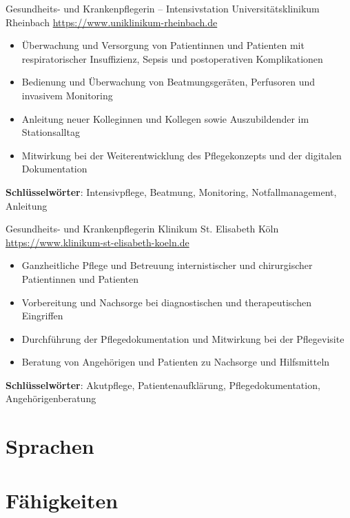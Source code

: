 \documentclass[a4paper, serif, 10pt]{moderncv}
\begin{document}
        {Gesundheits- und Krankenpflegerin – Intensivstation}
        {Universitätsklinikum Rheinbach}
        {\url{https://www.uniklinikum-rheinbach.de}}
        {}
        {\begin{itemize}
\item Überwachung und Versorgung von Patientinnen und Patienten mit respiratorischer Insuffizienz, Sepsis und postoperativen Komplikationen
\item Bedienung und Überwachung von Beatmungsgeräten, Perfusoren und invasivem Monitoring
\item Anleitung neuer Kolleginnen und Kollegen sowie Auszubildender im Stationsalltag
\item Mitwirkung bei der Weiterentwicklung des Pflegekonzepts und der digitalen Dokumentation
\end{itemize}
\textbf{Schlüsselwörter}: Intensivpflege, Beatmung, Monitoring, Notfallmanagement, Anleitung}

        {Gesundheits- und Krankenpflegerin}
        {Klinikum St. Elisabeth Köln}
        {\url{https://www.klinikum-st-elisabeth-koeln.de}}
        {}
        {\begin{itemize}
\item Ganzheitliche Pflege und Betreuung internistischer und chirurgischer Patientinnen und Patienten
\item Vorbereitung und Nachsorge bei diagnostischen und therapeutischen Eingriffen
\item Durchführung der Pflegedokumentation und Mitwirkung bei der Pflegevisite
\item Beratung von Angehörigen und Patienten zu Nachsorge und Hilfsmitteln
\end{itemize}
\textbf{Schlüsselwörter}: Akutpflege, Patientenaufklärung, Pflegedokumentation, Angehörigenberatung}
\section{Sprachen}

\section{Fähigkeiten}
\end{document}
